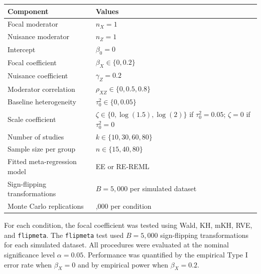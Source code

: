 \documentclass[
  man,
  longtable,
  nolmodern,
  notxfonts,
  notimes,
  colorlinks=true,linkcolor=blue,citecolor=blue,urlcolor=blue]{apa7}
\begin{document}
\begin{table}

{\caption{{Simulation grid parameter space, generating values, and
fitted meta-regression models.}{\label{tbl-sim-grid}}}
\vspace{-20pt}}

\begin{longtable}[]{@{}
  >{\raggedright\arraybackslash}p{}
  >{\raggedright\arraybackslash}p{}@{}}
\toprule\noalign{}
\begin{minipage}[b]{\linewidth}\raggedright
Component
\end{minipage} & \begin{minipage}[b]{\linewidth}\raggedright
Values
\end{minipage} \\
\midrule\noalign{}
\endhead
\bottomrule\noalign{}
\endlastfoot
Focal moderator & \(n_X = 1\) \\
Nuisance moderator & \(n_Z = 1\) \\
Intercept & \(\beta_0 = 0\) \\
Focal coefficient & \(\beta_X \in \{0, 0.2\}\) \\
Nuisance coefficient & \(\gamma_Z = 0.2\) \\
Moderator correlation & \(\rho_{XZ} \in \{0, 0.5, 0.8\}\) \\
Baseline heterogeneity & \(\tau_0^2 \in \{0, 0.05\}\) \\
Scale coefficient & \(\zeta \in \{0, \log(1.5), \log(2)\}\) if
\(\tau_0^2 = 0.05\); \(\zeta = 0\) if \(\tau_0^2 = 0\) \\
Number of studies & \(k \in \{10, 30, 60, 80\}\) \\
Sample size per group & \(n \in \{15, 40, 80\}\) \\
Fitted meta-regression model & EE or RE-REML \\
Sign-flipping transformations & \(B = 5,000\) per simulated dataset \\
Monte Carlo replications & 5,000 per condition \\
\end{longtable}

\end{table}

For each condition, the focal coefficient was tested using Wald, KH,
mKH, RVE, and \texttt{flipmeta}. The \texttt{flipmeta} test used
\(B = 5{,}000\) sign-flipping transformations for each simulated
dataset. All procedures were evaluated at the nominal significance level
\(\alpha=0.05\). Performance was quantified by the empirical Type I
error rate when \(\beta_X=0\) and by empirical power when
\(\beta_X=0.2\).
\end{document}
